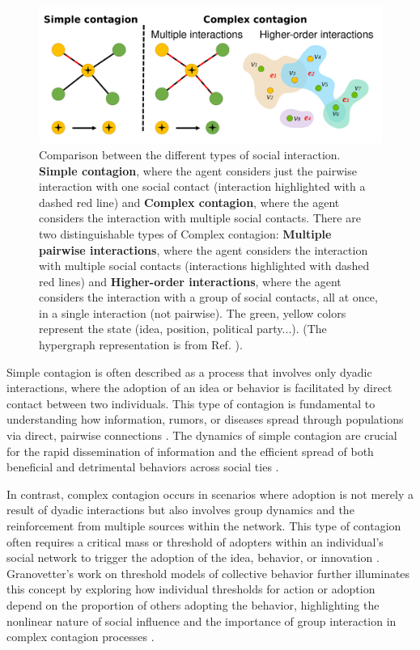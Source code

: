 \begin{figure}
    \centering
    \captionsetup{font=sf}
    \includegraphics[width=\textwidth]{Figs/complex_simple.pdf}
    \caption[Simple and complex contagion processes]{Comparison between the different types of social interaction. {\bfseries Simple contagion}, where the agent considers just the pairwise interaction with one social contact (interaction highlighted with a dashed red line) and {\bfseries Complex contagion}, where the agent considers the interaction with multiple social contacts. There are two distinguishable types of Complex contagion: {\bf Multiple pairwise interactions}, where the agent considers the interaction with multiple social contacts (interactions highlighted with dashed red lines) and {\bfseries Higher-order interactions}, where the agent considers the interaction with a group of social contacts, all at once, in a single interaction (not pairwise). The green, yellow colors represent the state (idea, position, political party...). (The hypergraph representation is from Ref. \cite{de-arruda-2020}).}
    \label{fig:SimpleComplexContagion}
\end{figure}

Simple contagion is often described as a process that involves only dyadic interactions, where the adoption of an idea or behavior is facilitated by direct contact between two individuals. This type of contagion is fundamental to understanding how information, rumors, or diseases spread through populations via direct, pairwise connections \cite{pastor2001epidemic, newman2002spread}. The dynamics of simple contagion are crucial for the rapid dissemination of information and the efficient spread of both beneficial and detrimental behaviors across social ties \cite{christakis2007spread, fowler2009cooperative}.

In contrast, complex contagion occurs in scenarios where adoption is not merely a result of dyadic interactions but also involves group dynamics and the reinforcement from multiple sources within the network. This type of contagion often requires a critical mass or threshold of adopters within an individual's social network to trigger the adoption of the idea, behavior, or innovation \cite{centola-2007,centola-2010}. Granovetter's work on threshold models of collective behavior further illuminates this concept by exploring how individual thresholds for action or adoption depend on the proportion of others adopting the behavior, highlighting the nonlinear nature of social influence and the importance of group interaction in complex contagion processes \cite{granovetter-1978}.

